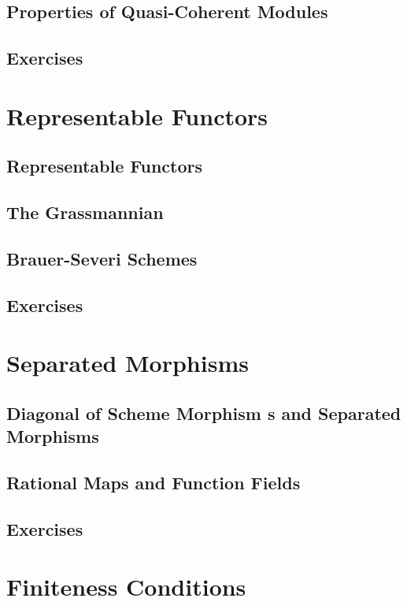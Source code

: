 \subsection{Properties of Quasi-Coherent Modules}
\subsection{Exercises}

\section{Representable Functors}

\subsection{Representable Functors}
\subsection{The Grassmannian}
\subsection{Brauer-Severi Schemes}
\subsection{Exercises}

\section{Separated Morphisms}

\subsection{Diagonal of Scheme Morphism s and Separated Morphisms}
\subsection{Rational Maps and Function Fields}
\subsection{Exercises}

\section{Finiteness Conditions}

\subsection{}

